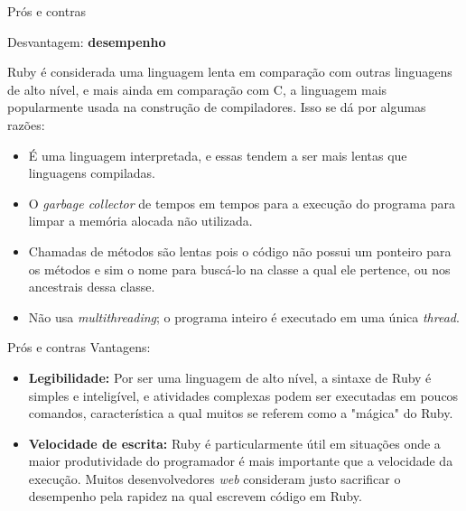 \documentclass{beamer}
\begin{document}

\begin{frame}{Prós e contras}

Desvantagem: \textbf{desempenho}

Ruby é considerada uma linguagem lenta em comparação com outras linguagens de alto nível, e mais ainda em comparação com C, a linguagem mais popularmente usada na construção de compiladores. Isso se dá por algumas razões:

\begin{itemize}
\item É uma linguagem interpretada, e essas tendem a ser mais lentas que linguagens compiladas.
\item O \textit{garbage collector} de tempos em tempos para a execução do programa para limpar a memória alocada não utilizada.
\item Chamadas de métodos são lentas pois o código não possui um ponteiro para os métodos e sim o nome para buscá-lo na classe a qual ele pertence, ou nos ancestrais dessa classe.
\item Não usa \textit{multithreading}; o programa inteiro é executado em uma única \textit{thread}.

\end{itemize}

\end{frame}


\begin{frame}{Prós e contras}
Vantagens:

\begin{itemize}
\item \textbf{Legibilidade:} Por ser uma linguagem de alto nível, a sintaxe de Ruby é simples e inteligível, e atividades complexas podem ser executadas em poucos comandos, característica a qual muitos se referem como a "mágica" do Ruby.

\item \textbf{Velocidade de escrita:} Ruby é particularmente útil em situações onde a maior produtividade do programador é mais importante que a velocidade da execução. Muitos desenvolvedores \textit{web} consideram justo sacrificar o desempenho pela rapidez na qual escrevem código em Ruby.

\end{itemize}

\end{frame}
\end{document}
